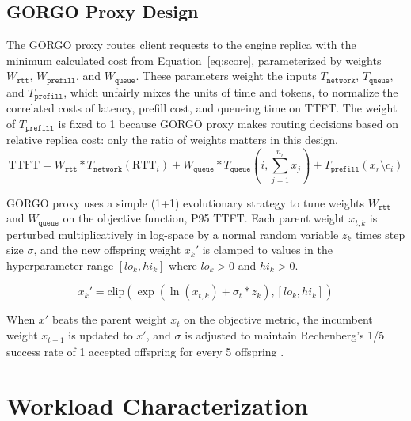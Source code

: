 \documentclass{article}
\begin{document}
\bigskip
\subsection{GORGO Proxy Design}

The GORGO proxy routes client requests to the engine replica with the minimum calculated cost from Equation~\ref{eq:score}, parameterized by weights $W_{\texttt{rtt}}$, $W_{\texttt{prefill}}$, and $W_{\texttt{queue}}$. These parameters weight the inputs $T_{\texttt{network}}$, $T_{\texttt{queue}}$, and $T_{\texttt{prefill}}$, which unfairly mixes the units of time and tokens, to normalize the correlated costs of latency, prefill cost, and queueing time on TTFT. The weight of $T_{\texttt{prefill}}$ is fixed to 1 because GORGO proxy makes routing decisions based on relative replica cost: only the ratio of weights matters in this design.
\begin{equation}
\mathrm{TTFT} = W_{\texttt{rtt}} * T_{\texttt{network}}(\mathrm{RTT}_i) + W_{\texttt{queue}} * T_{\texttt{queue}}\left(i, \sum_{j=1}^{n_r} x_j\right) + T_{\texttt{prefill}}(x_r \setminus c_i)
\label{eq:score}
\end{equation}

GORGO proxy uses a simple (1+1) evolutionary strategy to tune weights $W_{\texttt{rtt}}$ and $W_{\texttt{queue}}$ on the objective function, P95 TTFT.
Each parent weight $x_{t,k}$ is perturbed multiplicatively in log-space by a normal random variable $z_k$ times step size $\sigma$, and the new offspring weight $x_k'$ is clamped to values in the hyperparameter range $[lo_k, hi_k]$ where $lo_k > 0$ and $hi_k > 0$.

\begin{equation}
x_k' = \mathrm{clip}\left(\exp(\ln(x_{t,k}) + \sigma_t * z_k), [lo_k, hi_k]\right)
\end{equation}

When $x'$ beats the parent weight $x_t$ on the objective metric, the incumbent weight $x_{t+1}$ is updated to $x'$, and $\sigma$ is adjusted to maintain Rechenberg's 1/5 success rate of 1 accepted offspring for every 5 offspring \citep{rechenberg1973}.

\section{Workload Characterization}
\label{sec:characterization}
\end{document}
